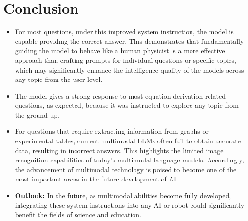 \documentclass[12pt]{article}
\begin{document}
\section{Conclusion}
\begin{itemize}
    \item For most questions, under this improved system instruction, the model is capable providing the correct answer. This demonstrates that fundamentally guiding the model to behave like a human physicist is a more effective approach than crafting prompts for individual questions or specific topics, which may significantly enhance the intelligence quality of the models across any topic from the user level.
    \item The model gives a strong response to most equation derivation-related questions, as expected, because it was instructed to explore any topic from the ground up.
    \item For questions that require extracting information from graphs or experimental tables, current multimodal LLMs often fail to obtain accurate data, resulting in incorrect answers. This highlights the limited image recognition capabilities of today's multimodal language models. Accordingly, the advancement of multimodal technology is poised to become one of the most important areas in the future development of AI.
    \item \textbf{Outlook:} In the future, as multimodal abilities become fully developed, integrating these system instructions into any AI or robot could significantly benefit the fields of science and education.
\end{itemize}




\newpage

\nocite{*}
  
 
\end{document}
